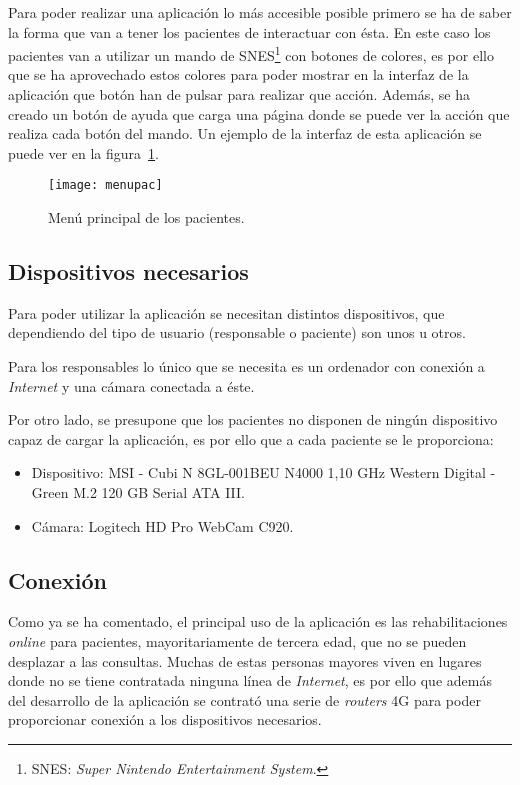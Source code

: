Para poder realizar una aplicación lo más accesible posible primero se ha de saber la forma que van a tener los pacientes de interactuar con ésta. En este caso los pacientes van a utilizar un mando de SNES\footnote{SNES: \textit{Super Nintendo Entertainment System}.} con botones de colores, es por ello que se ha aprovechado estos colores para poder mostrar en la interfaz de la aplicación que botón han de pulsar para realizar que acción. Además, se ha creado un botón de ayuda que carga una página donde se puede ver la acción que realiza cada botón del mando. Un ejemplo de la interfaz de esta aplicación se puede ver en la figura~\ref{fig:menupaciente}.

\begin{figure}[h]
	\centering
	\texttt{[image: menupac]}
	\caption{Menú principal de los pacientes.}
	\label{fig:menupaciente}
\end{figure}

\subsection{Dispositivos necesarios}
Para poder utilizar la aplicación se necesitan distintos dispositivos, que dependiendo del tipo de usuario (responsable o paciente) son unos u otros.

Para los responsables lo único que se necesita es un ordenador con conexión a \textit{Internet} y una cámara conectada a éste.

Por otro lado, se presupone que los pacientes no disponen de ningún dispositivo capaz de cargar la aplicación, es por ello que a cada paciente se le proporciona:
\begin{itemize}
	\item Dispositivo: MSI - Cubi N 8GL-001BEU N4000 1,10 GHz Western Digital - Green M.2 120 GB Serial ATA III.
	\item Cámara: Logitech HD Pro WebCam C920.
\end{itemize}

\subsection{Conexión}
Como ya se ha comentado, el principal uso de la aplicación es las rehabilitaciones \textit{online} para pacientes, mayoritariamente de tercera edad, que no se pueden desplazar a las consultas. Muchas de estas personas mayores viven en lugares donde no se tiene contratada ninguna línea de \textit{Internet}, es por ello que además del desarrollo de la aplicación se contrató una serie de \textit{routers} 4G para poder proporcionar conexión a los dispositivos necesarios. 


